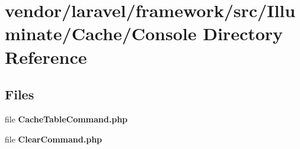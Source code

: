 \section{vendor/laravel/framework/src/\+Illuminate/\+Cache/\+Console Directory Reference}
\label{dir_c46fbd5415e84e230d3efbcaa27180b9}
\subsection*{Files}
\begin{DoxyCompactItemize}
\item 
file {\bf Cache\+Table\+Command.\+php}
\item 
file {\bf Clear\+Command.\+php}
\end{DoxyCompactItemize}
